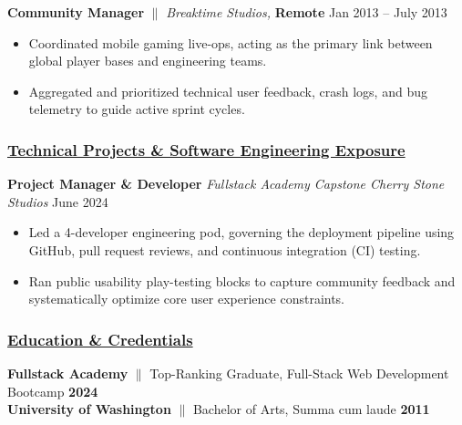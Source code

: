 \documentclass[a4paper,10pt]{article}
\begin{document}
\vspace{1.5mm}
{\textbf{Community Manager} {$\parallel$} \textit{Breaktime Studios,}  \textbf{Remote} \hfill {Jan 2013 – July 2013}}
\begin{itemize}
      \item Coordinated mobile gaming live-ops, acting as the primary link between global player bases and engineering teams.
      \item Aggregated and prioritized technical user feedback, crash logs, and bug telemetry to guide active sprint cycles.
\end{itemize}

\subsubsection{\underline{Technical Projects \& Software Engineering Exposure}}

{\textbf{Project Manager \& Developer} \textit{Fullstack Academy Capstone Cherry Stone Studios} \hfill {June 2024}}
\begin{itemize}
      \item Led a 4-developer engineering pod, governing the deployment pipeline using GitHub, pull request reviews, and continuous integration (CI) testing.
      \item Ran public usability play-testing blocks to capture community feedback and systematically optimize core user experience constraints.
\end{itemize}

\subsubsection{\underline{Education \& Credentials}}
\textbf{Fullstack Academy} {$\parallel$} Top-Ranking Graduate, Full-Stack Web Development Bootcamp \hfill \textbf{2024} \\
\textbf{University of Washington} {$\parallel$} Bachelor of Arts, Summa cum laude \hfill \textbf{2011}
\end{document}
